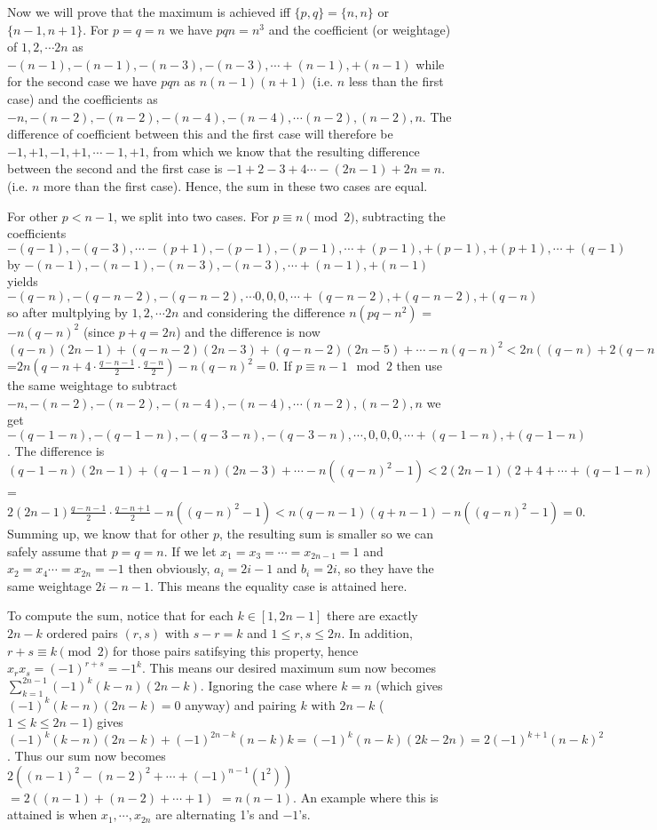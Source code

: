 \documentclass[11pt,a4paper]{article}
\begin{document}
\begin{enumerate}
Now we will prove that the maximum is achieved iff $\{p, q\}=\{n,n\}$ or $\{n-1, n+1\}$. 
For $p=q=n$ we have $pqn=n^3$ and the coefficient (or weightage) of $1,2,\cdots 2n$ as $-(n-1), -(n-1), -(n-3), -(n-3),\cdots +(n-1), +(n-1)$ while for the second case we have $pqn$ as $n(n-1)(n+1)$ (i.e. $n$ less than the first case) and the coefficients as $-n, -(n-2), -(n-2), -(n-4), -(n-4),\cdots (n-2), (n-2), n$. 
The difference of coefficient between this and the first case will therefore be $-1, +1, -1, +1,\cdots -1, +1$, from which we know that the resulting difference between the second and the first case is $-1+2-3+4\cdots -(2n-1)+2n=n$. (i.e. $n$ more than the first case). Hence, the sum in these two cases are equal. 

For other $p<n-1$, we split into two cases. For $p\equiv n\pmod{2}$, subtracting the coefficients $-(q-1),-(q-3),\cdots -(p+1), -(p-1),-(p-1),\cdots +(p-1),+(p-1), +(p+1),\cdots +(q-1)$ by $-(n-1), -(n-1), -(n-3), -(n-3),\cdots +(n-1), +(n-1)$ yields $-(q-n), -(q-n-2), -(q-n-2),\cdots 0, 0, 0,\cdots +(q-n-2), +(q-n-2), +(q-n)$ so after multplying by $1,2,\cdots 2n$ and considering the difference $n(pq-n^2)$ = $-n(q-n)^2$ (since $p+q=2n$) and the difference is now $(q-n)(2n-1)+(q-n-2)(2n-3)+(q-n-2)(2n-5)+\cdots -n(q-n)^2<2n((q-n)+2(q-n-2)+2(q-n-4)+\cdots+2(2))-n(q-n)^2$=$2n(q-n+4\cdot \frac{q-n-1}{2}\cdot\frac{q-n}{2})-n(q-n)^2=0.$ If $p\equiv n-1\mod{2}$ then use the same weightage to subtract $-n, -(n-2), -(n-2), -(n-4), -(n-4),\cdots (n-2), (n-2), n$ we get $-(q-1-n), -(q-1-n), -(q-3-n), -(q-3-n),\cdots ,0,0,0,\cdots +(q-1-n), +(q-1-n)$. The difference is $(q-1-n)(2n-1)+(q-1-n)(2n-3)+\cdots -n((q-n)^2-1)<2(2n-1)(2+4+\cdots +(q-1-n))-n((q-n)^2-1)$= $2(2n-1)\frac{q-n-1}{2}\cdot\frac{q-n+1}{2}-n((q-n)^2-1)<n(q-n-1)(q+n-1)-n((q-n)^2-1)=0.$ Summing up, we know that for other $p$, the resulting sum is smaller so we can safely assume that $p=q=n$. If we let $x_1=x_3=\cdots =x_{2n-1}=1$ and $x_2=x_4\cdots =x_{2n}=-1$ then obviously, $a_i=2i-1$ and $b_i=2i$, so they have the same weightage $2i-n-1$. This means the equality case is attained here.

To compute the sum, notice that for each $k\in [1, 2n-1]$ there are exactly $2n-k$ ordered pairs $(r,s)$ with $s-r=k$ and $1\le r, s\le 2n$. 
In addition, $r+s\equiv k\pmod{2}$ for those pairs satifsying this property, hence $x_rx_s=(-1)^{r+s}={-1}^k$. 
This means our desired maximum sum now becomes
$\displaystyle\sum_{k=1}^{2n-1}(-1)^k(k-n)(2n-k)$. 
Ignoring the case where $k=n$ (which gives $(-1)^k(k-n)(2n-k)=0$ anyway) and pairing $k$ with $2n-k$ ($1\le k\le 2n-1$) gives
$(-1)^k(k-n)(2n-k)+(-1)^{2n-k}(n-k)k=(-1)^k(n-k)(2k-2n)=2(-1)^{k+1}(n-k)^2$. 
Thus our sum now becomes 
$2((n-1)^2-(n-2)^2+\cdots +(-1)^{n-1}(1^2))$
$=2((n-1)+(n-2)+\cdots + 1)$
$=n(n-1)$. 
An example where this is attained is when $x_1, \cdots, x_{2n}$ are alternating 1's and $-1$'s. 


\end{enumerate}
\end{document}
